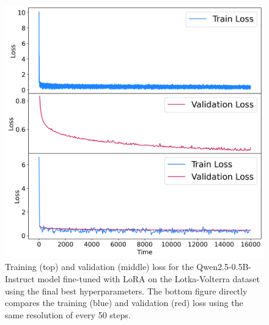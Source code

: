 \documentclass[11pt,a4paper]{article}
\begin{document}
\begin{figure}
    \centering
    \includegraphics[width=\columnwidth, keepaspectratio]{../plots/lora_final_loss.png}
    \caption{Training (top) and validation (middle) loss for the Qwen2.5-0.5B-Instruct model fine-tuned with LoRA on the Lotka-Volterra dataset using the final best hyperparameters. The bottom figure directly compares the training (blue) and validation (red) loss using the same resolution of every 50 steps.}
    \label{fig:lora_final_loss}    
\end{figure}
\end{document}
